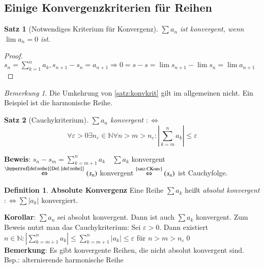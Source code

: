 \documentclass[ngerman,titlepage,twoside, parskip=half*]{scrreprt}
\newcommand*{\N}{\mathbb{N}}
\newcommand*{\perdef}{:\Leftrightarrow}
\theoremstyle{plain}
\newtheorem{theorem}{Satz}[section]
\theoremstyle{definition}
\newtheorem{definition}{Definition}
\theoremstyle{remark}
\newtheorem*{remark}{Bemerkung}
\begin{document}
\subsection{Einige Konvergenzkriterien für Reihen}

\begin{theorem}[Notwendiges Kriterium für
  Konvergenz]
\label{satz:konvkrit}
$\sum a_n$ ist konvergent, wenn  $\lim a_n=0$ ist.
\end{theorem}
\begin{proof}
  $s_n=\sum_{k=1}^n a_k, s_{n+1}-s_n=a_{n+1} \Rightarrow
  0=s-s=\lim s_{n+1}-\lim s_n=\lim a_{n+1}$
\end{proof}

\begin{remark}
  Die Umkehrung von \autoref{satz:konvkrit} gilt im allgemeinen
  nicht. Ein Beispiel ist die harmonische Reihe.
\end{remark}

\begin{theorem}[Cauchykriterium]
\label{satz:CKrit}
 $\sum a_n$ konvergent $\perdef$
\[\forall \varepsilon >0 \exists n_{\varepsilon}\in \N \forall n>m>n_{\varepsilon}\colon\left|\sum_{k=m}^n a_k\right|
\leq \varepsilon\]
\end{theorem}
\textbf{Beweis}: $s_n-s_m=\sum_{k=m+1}^n a_k\quad \sum a_k$ konvergent
$\stackrel{\text{\hyperref[def:reihe]{Def.\,\ref*{def:reihe}}}}{\Leftrightarrow}
(s_n)$ konvergent $\stackrel{\text{\autoref{satz:CKonv}}}{\Leftrightarrow}(s_n)$ ist Cauchyfolge.

\begin{definition}
\textbf{Absolute Konvergenz} Eine Reihe $\sum a_k$ heißt \emph{absolut konvergent}
$\perdef \sum |a_k|$ konvergiert.
\end{definition}

\textbf{Korollar}: $\sum a_n$ sei absolut konvergent. Dann ist auch $\sum a_k$ konvergent.
Zum Beweis nutzt man das Cauchykriterium: Sei $\varepsilon >0$. Dann existiert $n\in \N \colon |\sum_{k=m+1}^n a_k|\leq 
\sum_{k=m+1}^n |a_k|\leq \varepsilon$ für $n>m>n_{\varepsilon}$\qed\\
\textbf{Bemerkung}: Es gibt konvergente Reihen, die nicht absolut konvergent sind. Bsp.: al\-ter\-nie\-rende harmonische
Reihe
\end{document}
